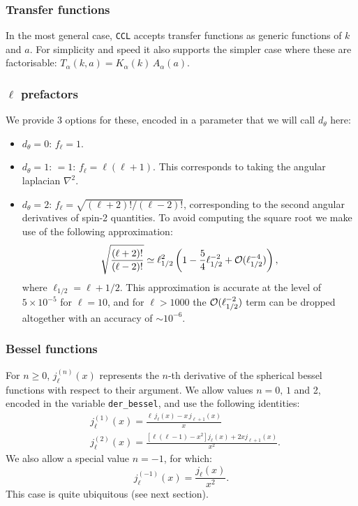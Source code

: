 \documentclass[\docopts]{\docclass}
\begin{document}
\subsubsection*{Transfer functions}
In the most general case, {\tt CCL} accepts transfer functions as generic functions of $k$ and $a$. For simplicity and speed it also supports the simpler case where these are factorisable: $T_\alpha(k,a)=K_\alpha(k)\,A_\alpha(a)$.

\subsubsection*{$\ell$ prefactors}
We provide 3 options for these, encoded in a parameter that we will call $d_\theta$ here:
\begin{itemize}
 \item $d_\theta=0$: $f_\ell=1$.
 \item $d_\theta=1$: $=1$: $f_\ell=\ell(\ell+1)$. This corresponds to taking the angular laplacian $\nabla^2$.
 \item $d_\theta=2$: $f_\ell=\sqrt{(\ell+2)!/(\ell-2)!}$, corresponding to the second angular derivatives of spin-2 quantities. To avoid computing the square root we make use of the following approximation:
   \begin{equation}
     \sqrt{\frac{(\ell+2)!}{(\ell-2)!}}\simeq \ell_{1/2}^2\left(1-\frac{5}{4}\ell_{1/2}^{-2}+{\cal O}(\ell_{1/2}^{-4})\right),
   \end{equation}
   where $\ell_{1/2}=\ell+1/2$. This approximation is accurate at the level of $5\times10^{-5}$ for $\ell=10$, and for $\ell>1000$ the ${\cal O}(\ell_{1/2}^{-2})$ term can be dropped altogether with an accuracy of $\sim10^{-6}$.
\end{itemize}

\subsubsection*{Bessel functions}
  For $n\ge0$, $j^{(n)}_\ell(x)$ represents the $n$-th derivative of the spherical bessel functions with respect to their argument. We allow values $n=0,\,1$ and 2, encoded in the variable {\tt der\_bessel}, and use the following identities:
  \begin{align}
    &j^{(1)}_\ell(x)=\frac{\ell\,j_\ell(x)-x\,j_{\ell+1}(x)}{x}\\
    &j^{(2)}_\ell(x)=\frac{[\ell(\ell-1)-x^2]j_\ell(x)+2xj_{\ell+1}(x)}{x^2}.
  \end{align}
  We also allow a special value $n=-1$, for which:
  \begin{equation}
    j^{(-1)}_\ell(x)=\frac{j_\ell(x)}{x^2}.
  \end{equation}
  This case is quite ubiquitous (see next section).
\end{document}
